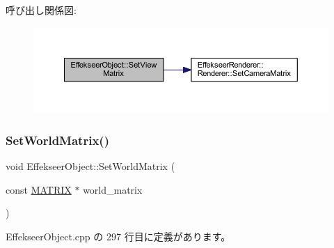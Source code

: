 呼び出し関係図\+:\nopagebreak
\begin{figure}[H]
\begin{center}
\leavevmode
\includegraphics[width=350pt]{class_effekseer_object_ac7f3145b79b5e65e45014abd30ee5de8_cgraph}
\end{center}
\end{figure}
\mbox{\label{class_effekseer_object_afde70f366e91d31a84ff9b280d4ae3c4}} 
\subsubsection{\texorpdfstring{Set\+World\+Matrix()}{SetWorldMatrix()}}
{\footnotesize\ttfamily void Effekseer\+Object\+::\+Set\+World\+Matrix (\begin{DoxyParamCaption}\item[{const \mbox{\hyperlink{_vector3_d_8h_a032295cd9fb1b711757c90667278e744}{M\+A\+T\+R\+IX}} $\ast$}]{world\+\_\+matrix }\end{DoxyParamCaption})\hspace{0.3cm}{\ttfamily [private]}}



 Effekseer\+Object.\+cpp の 297 行目に定義があります。

